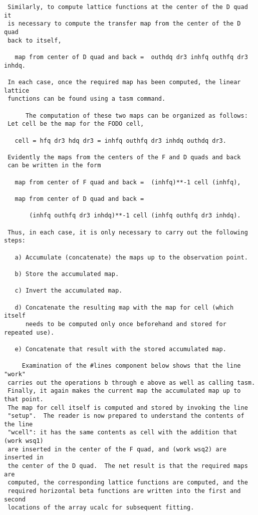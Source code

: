 \begin{footnotesize}
\begin{verbatim}
 Similarly, to compute lattice functions at the center of the D quad it
 is necessary to compute the transfer map from the center of the D quad
 back to itself,

   map from center of D quad and back =  outhdq dr3 inhfq outhfq dr3 inhdq.

 In each case, once the required map has been computed, the linear lattice
 functions can be found using a tasm command.

      The computation of these two maps can be organized as follows:
 Let cell be the map for the FODO cell,

   cell = hfq dr3 hdq dr3 = inhfq outhfq dr3 inhdq outhdq dr3.

 Evidently the maps from the centers of the F and D quads and back
 can be written in the form

   map from center of F quad and back =  (inhfq)**-1 cell (inhfq),

   map from center of D quad and back =

       (inhfq outhfq dr3 inhdq)**-1 cell (inhfq outhfq dr3 inhdq).

 Thus, in each case, it is only necessary to carry out the following steps:

   a) Accumulate (concatenate) the maps up to the observation point.

   b) Store the accumulated map.

   c) Invert the accumulated map.

   d) Concatenate the resulting map with the map for cell (which itself
      needs to be computed only once beforehand and stored for repeated use).

   e) Concatenate that result with the stored accumulated map.

     Examination of the #lines component below shows that the line "work"
 carries out the operations b through e above as well as calling tasm.
 Finally, it again makes the current map the accumulated map up to that point.
 The map for cell itself is computed and stored by invoking the line
 "setup".  The reader is now prepared to understand the contents of the line
 "wcell": it has the same contents as cell with the addition that (work wsq1)
 are inserted in the center of the F quad, and (work wsq2) are inserted in
 the center of the D quad.  The net result is that the required maps are
 computed, the corresponding lattice functions are computed, and the
 required horizontal beta functions are written into the first and second
 locations of the array ucalc for subsequent fitting.


\end{verbatim}
\end{footnotesize}
